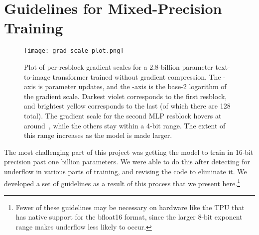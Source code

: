 \documentclass{article}
\begin{document}
\section{Guidelines for Mixed-Precision Training}
\label{sec:mp_train_guidelines}
\begin{figure}[t]
    \centering
    \texttt{[image: grad\_scale\_plot.png]}
    \caption{Plot of per-resblock gradient scales for a 2.8-billion parameter text-to-image transformer trained without gradient compression. The -axis is parameter updates, and the -axis is the base-2 logarithm of the gradient scale. Darkest violet corresponds to the first resblock, and brightest yellow corresponds to the last (of which there are 128 total). The gradient scale for the second MLP resblock hovers at around~, while the others stay within a 4-bit range. The extent of this range increases as the model is made larger.}
    \label{fig:grad_scale_plot}
\end{figure}
The most challenging part of this project was getting the model to train in 16-bit precision past one billion parameters. We were able to do this after detecting for underflow in various parts of training, and revising the code to eliminate it. We developed a set of guidelines as a result of this process that we present here.\footnote{Fewer of these guidelines may be necessary on hardware like the TPU that has native support for the bfloat16 format, since the larger 8-bit exponent range makes underflow less likely to occur.}
\end{document}
